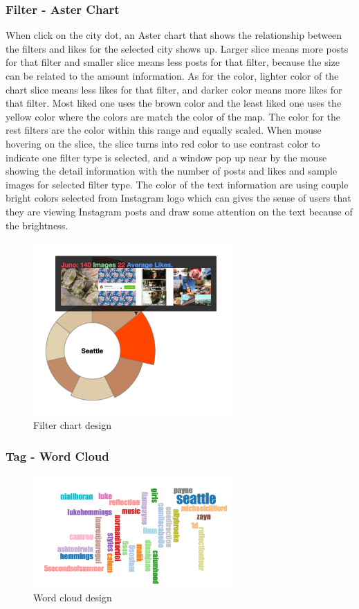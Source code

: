 \documentclass[conference]{acmsiggraph}
\begin{document}
\subsubsection{Filter - Aster Chart}

When click on the city dot, an Aster chart that shows the relationship between the filters and likes for the selected city shows up. Larger slice means more posts for that filter and smaller slice means less posts for that filter, because the size can be related to the amount information. As for the color, lighter color of the chart slice means less likes for that filter, and darker color means more likes for that filter. Most liked one uses the brown color and the least liked one uses the yellow color where the colors are match the color of the map. The color for the rest filters are the color within this range and equally scaled. When mouse hovering on the slice, the slice turns into red color to use contrast color to indicate one filter type is selected, and a window pop up near by the mouse showing the detail information with the number of posts and likes and sample images for selected filter type. The color of the text information are using couple bright colors selected from Instagram logo which can gives the sense of users that they are viewing Instagram posts and draw some attention on the text because of the brightness. 

\begin{figure}[ht]
  \centering
\includegraphics[width=3in]{images/chart}
  \caption{Filter chart design}
  \label{like-filter}
\end{figure}

\subsubsection{Tag - Word Cloud}

\begin{figure}[ht]
  \centering
\includegraphics[width=3in]{images/word}
  \caption{Word cloud design}
  \label{like-filter}
\end{figure}
\end{document}
